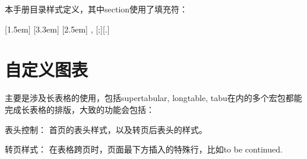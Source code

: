 本手册目录样式定义，其中section使用了填充符：
\begin{latex}{}
[1.5em]{}{\contentslabel{1.5em}}
    {\hspace*{-2em}}{\hfill\contentspage}
[3.3em]{}
    {\contentslabel{1.8em}}{\hspace*{-2.3em}}
    {\titlerule*[8pt]{$\cdot$}\contentspage}
[2.5em]{\small}
    {\thecontentslabel{}}{}
    {, \thecontentspage}[;\qquad][.]
\end{latex}

\section{自定义图表}
\label{sec:figtab}
主要是涉及长表格的使用，包括supertabular, longtable, tabu在内的多个宏包都能完成长表格的排版，大致的功能会包括：
\begin{para}
\item[表头控制：] 首页的表头样式，以及转页后表头的样式。
\item[转页样式：] 在表格跨页时，页面最下方插入的特殊行，比如to be continued. 
\end{para}

